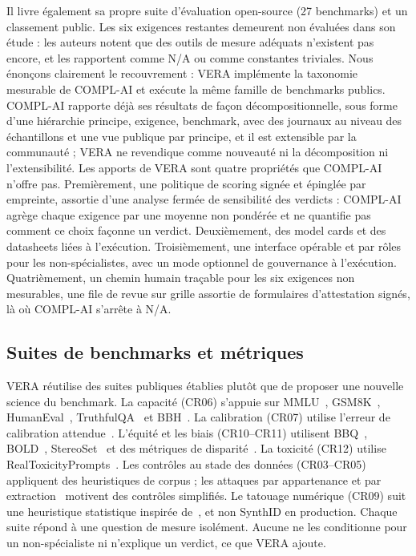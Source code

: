 \documentclass[10pt,conference]{IEEEtran}
\begin{document}
Il livre également sa propre suite d'évaluation open-source (27 benchmarks) et un classement public.
Les six exigences restantes demeurent non évaluées dans son étude : les auteurs notent que des outils de mesure adéquats n'existent pas encore, et les rapportent comme N/A ou comme constantes triviales.
Nous énonçons clairement le recouvrement : VERA implémente la taxonomie mesurable de COMPL-AI et exécute la même famille de benchmarks publics.
COMPL-AI rapporte déjà ses résultats de façon décompositionnelle, sous forme d'une hiérarchie principe, exigence, benchmark, avec des journaux au niveau des échantillons et une vue publique par principe, et il est extensible par la communauté ; VERA ne revendique comme nouveauté ni la décomposition ni l'extensibilité.
Les apports de VERA sont quatre propriétés que COMPL-AI n'offre pas.
Premièrement, une politique de scoring signée et épinglée par empreinte, assortie d'une analyse fermée de sensibilité des verdicts : COMPL-AI agrège chaque exigence par une moyenne non pondérée et ne quantifie pas comment ce choix façonne un verdict.
Deuxièmement, des model cards et des datasheets liées à l'exécution.
Troisièmement, une interface opérable et par rôles pour les non-spécialistes, avec un mode optionnel de gouvernance à l'exécution.
Quatrièmement, un chemin humain traçable pour les six exigences non mesurables, une file de revue sur grille assortie de formulaires d'attestation signés, là où COMPL-AI s'arrête à N/A.

\subsection{Suites de benchmarks et métriques}
VERA réutilise des suites publiques établies plutôt que de proposer une nouvelle science du benchmark.
La capacité (CR06) s'appuie sur MMLU~\cite{hendrycks2021mmlu}, GSM8K~\cite{cobbe2021gsm8k}, HumanEval~\cite{chen2021humaneval}, TruthfulQA~\cite{lin2022truthfulqa} et BBH~\cite{suzgun2023bbh}.
La calibration (CR07) utilise l'erreur de calibration attendue~\cite{guo2017calibration}.
L'équité et les biais (CR10--CR11) utilisent BBQ~\cite{parrish2022bbq}, BOLD~\cite{dhamala2021bold}, StereoSet~\cite{nadeem2021stereoset} et des métriques de disparité~\cite{hardt2016equality,wang2023decodingtrust}.
La toxicité (CR12) utilise RealToxicityPrompts~\cite{gehman2020realtoxicity}.
Les contrôles au stade des données (CR03--CR05) appliquent des heuristiques de corpus ; les attaques par appartenance et par extraction~\cite{carlini2021membership,carlini2023extracting} motivent des contrôles simplifiés.
Le tatouage numérique (CR09) suit une heuristique statistique inspirée de~\cite{kirchenbauer2023watermark}, et non SynthID en production.
Chaque suite répond à une question de mesure isolément.
Aucune ne les conditionne pour un non-spécialiste ni n'explique un verdict, ce que VERA ajoute.
\end{document}
